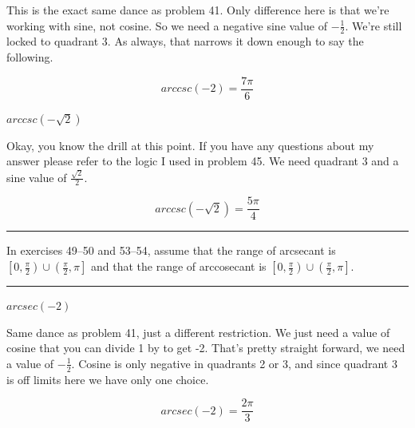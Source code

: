 \documentclass[10pt,letterpaper]{amspset}
\begin{document}
\begin{solution}
    This is the exact same dance as problem 41. Only difference here is that we're working with sine, not cosine. So we need a negative sine value of $-\frac{1}{2}$. We're still locked to quadrant 3. As always, that narrows it down enough to say the following.
    
    \[\boxed{ arccsc(-2) = \frac{7\pi}{6}  }\]
\end{solution}


\begin{problem}[46]
    $arccsc(-\sqrt{2})$
\end{problem}

\begin{solution}
    Okay, you know the drill at this point. If you have any questions about my answer please refer to the logic I used in problem 45. We need quadrant 3 and a sine value of $\frac{\sqrt{2}}{2}$. 
    
    \[\boxed{ arccsc(-\sqrt{2}) = \frac{5\pi}{4}   }\]
\end{solution}

\pagebreak
\hrule \medskip

In exercises 49--50 and 53--54, assume that the range of arcsecant is $\left[ 0 , \frac{\pi}{2} \right) \cup \left( \frac{\pi}{2}, \pi \right]$ and that the range of arccosecant is $\left[ 0 , \frac{\pi}{2} \right) \cup \left( \frac{\pi}{2}, \pi \right]$.
\medskip


\medskip
\hrule


\begin{problem}[49]
    $arcsec(-2)$
\end{problem}

\begin{solution}
    Same dance as problem 41, just a different restriction. We just need a value of cosine that you can divide 1 by to get -2. That's pretty straight forward, we need a value of $-\frac{1}{2}$. Cosine is only negative in quadrants 2 or 3, and since quadrant 3 is off limits here we have only one choice. 
    
    \[\boxed{  arcsec(-2) = \frac{2\pi}{3}  }\]
\end{solution}
\end{document}
